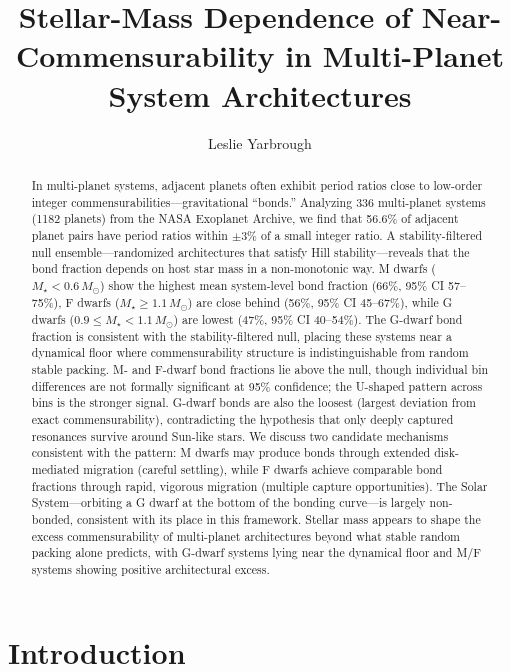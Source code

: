 \documentclass[twocolumn]{aastex631}
\begin{document}
\title{Stellar-Mass Dependence of Near-Commensurability in Multi-Planet System
Architectures}

\author{Leslie Yarbrough}

\graphicspath{{../figures/}}

\begin{abstract}
In multi-planet systems, adjacent planets often exhibit period ratios close to
low-order integer commensurabilities---gravitational ``bonds.'' Analyzing 336
multi-planet systems (1182 planets) from the NASA Exoplanet Archive, we find
that 56.6\% of adjacent planet pairs have period ratios within $\pm 3\%$ of a
small integer ratio. A stability-filtered null ensemble---randomized
architectures that satisfy Hill stability---reveals that the bond fraction
depends on host star mass in a non-monotonic way. M dwarfs
($M_\star < 0.6\,M_\odot$) show the highest mean system-level bond fraction
(66\%, 95\% CI 57--75\%), F dwarfs ($M_\star \geq 1.1\,M_\odot$) are close
behind (56\%, 95\% CI 45--67\%), while G dwarfs
($0.9 \leq M_\star < 1.1\,M_\odot$) are lowest (47\%, 95\% CI 40--54\%).
The G-dwarf bond fraction is consistent with the stability-filtered null,
placing these systems near a dynamical floor where commensurability structure
is indistinguishable from random stable packing. M- and F-dwarf bond fractions
lie above the null, though individual bin differences are not formally
significant at 95\% confidence; the U-shaped pattern across bins is the
stronger signal. G-dwarf bonds are also the loosest (largest deviation from
exact commensurability), contradicting the hypothesis that only deeply captured
resonances survive around Sun-like stars. We discuss two candidate mechanisms
consistent with the pattern: M dwarfs may produce bonds through extended
disk-mediated migration (careful settling), while F dwarfs achieve comparable
bond fractions through rapid, vigorous migration (multiple capture
opportunities). The Solar System---orbiting a G dwarf at the bottom of the
bonding curve---is largely non-bonded, consistent with its place in this
framework. Stellar mass appears to shape the excess commensurability of
multi-planet architectures beyond what stable random packing alone predicts,
with G-dwarf systems lying near the dynamical floor and M/F systems showing
positive architectural excess.
\end{abstract}

\section{Introduction}
\label{sec:intro}
\end{document}
